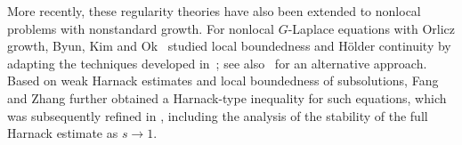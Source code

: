 \documentclass[reqno]{amsart}
\theoremstyle{plain}
\theoremstyle{definition}
\theoremstyle{remark}
\numberwithin{equation}{section}
\begin{document}

More recently, these regularity theories have also been extended to nonlocal problems with
nonstandard growth. For nonlocal \(G\)-Laplace equations with Orlicz growth,
Byun, Kim and Ok~\cite{BKO} studied local boundedness and H\"older continuity
by adapting the techniques developed in~\cite{DKP16}; see also~\cite{CKW22}
for an alternative approach. Based on weak Harnack estimates and local boundedness of subsolutions, Fang and Zhang \cite{FZ23} further obtained a Harnack-type inequality for such equations, which was subsequently refined in \cite{CKW23,BKS23}, including the analysis of the stability of the full Harnack estimate as \(s\to1\). 
\end{document}
